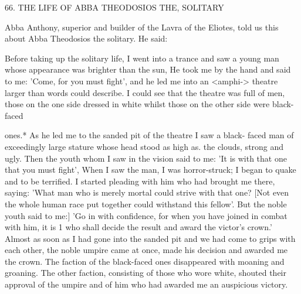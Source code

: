 66. THE LIFE OF ABBA THEODOSIOS THE, SOLITARY

Abba Anthony, superior and builder of the Lavra of the Eliotes,
told us this about Abba Theodosios the solitary. He said:

Before taking up the solitary life, I went into a trance and saw a
young man whose appearance was brighter than the sun, He took
me by the hand and said to me: 'Come, for you must fight', and he
led me into an <amphi-> theatre larger than words could describe.
I could see that the theatre was full of men, those on the one side
dressed in white whilst those on the other side were black-faced

ones.* As he led me to the sanded pit of the theatre I saw a black-
faced man of exceedingly large stature whose head stood as high as.
the clouds, strong and ugly. Then the youth whom I saw in the
vision said to me: 'It is with that one that you must fight', When I
saw the man, I was horror-struck; I began to quake and to be
terrified. I started pleading with him who had brought me there,
saying: 'What man who is merely mortal could strive with that one?
[Not even the whole human race put together could withstand this
fellow'. But the noble youth said to me:] 'Go in with confidence, for
when you have joined in combat with him, it is 1 who shall decide
the result and award the victor's crown.' Almost as soon as I had
gone into the sanded pit and we had come to grips with each other,
the noble umpire came at once, made his decision and awarded me
the crown. The faction of the black-faced ones disappeared with
moaning and groaning. The other faction, consisting of those who
wore white, shouted their approval of the umpire and of him who
had awarded me an auspicious victory.

